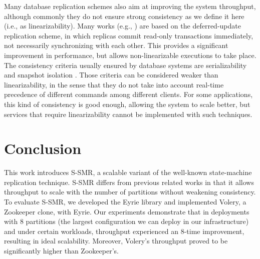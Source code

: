 \documentclass[10pt, conference, compsocconf, letterpaper]{IEEEtranv17}
\providecommand{\DIFadd}[1]{{\protect\color{blue}\uwave{#1}}} %
\providecommand{\DIFaddbegin}{} %
\providecommand{\DIFaddend}{} %
\providecommand{\DIFdelbegin}{} %
\providecommand{\DIFdelend}{} %
\begin{document}
Many database replication schemes also aim at improving the system throughput, although commonly they do not ensure strong consistency as we define it here (i.e., as linearizability). Many works (e.g., \DIFdelbegin %
\DIFdelend \DIFaddbegin \cite{sciascia2012sdur, SousaOMP01, chun96dur, kobus2013hybrid}\DIFaddend ) are based on the deferred-update replication scheme, in which replicas commit read-only transactions immediately, not necessarily synchronizing with each other. This provides a significant improvement in performance, but allows non-linearizable executions to take place. The consistency criteria usually ensured by database systems are serializability \cite{BHG87} and snapshot isolation \cite{LinKJPA09}. Those criteria can be considered weaker than linearizability, in the sense that they do not take into account real-time precedence of different commands among different clients. For some applications, this kind of consistency is good enough, allowing the system to scale better, but services that require linearizability cannot be implemented with such techniques.


\section{Conclusion}
\label{sec:conclusion}

This work introduces S-SMR, a scalable variant of the well-known state-machine replication technique. 
S-SMR differs from previous related works in that it allows throughput to scale with the number of partitions without weakening consistency. 
To evaluate S-SMR, we developed the Eyrie library and implemented Volery, a Zookeeper clone, with Eyrie.
Our experiments demonstrate that in deployments with 8 partitions (the largest configuration we can deploy in our infrastructure) and under certain workloads, throughput experienced an 8-time improvement, resulting in ideal scalability.
Moreover, Volery's throughput proved to be significantly higher than Zookeeper's.
\DIFaddbegin 

\section*{\DIFadd{Acknowledgements}}
\label{sec:acknowledgements}
\end{document}
